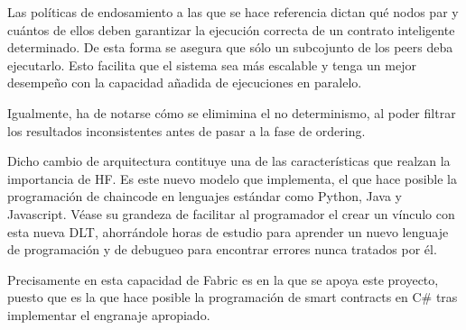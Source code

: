 Las pol\'iticas de endosamiento a las que se hace referencia dictan qu\'e nodos par y cu\'antos de ellos deben garantizar la ejecuci\'on correcta de un contrato inteligente determinado. De esta forma se asegura que s\'olo un subcojunto de los peers deba ejecutarlo. Esto facilita que el sistema sea m\'as escalable y tenga un mejor desempe\~no con la capacidad a\~nadida de ejecuciones en paralelo.

Igualmente, ha de notarse c\'omo se elimimina el no determinismo, al poder filtrar los resultados inconsistentes antes de pasar a la fase de ordering.

Dicho cambio de arquitectura contituye una de las caracter\'isticas que realzan la importancia de HF. Es este nuevo modelo que implementa, el que hace posible la programaci\'on de chaincode en lenguajes est\'andar como Python, Java y Javascript. V\'ease su grandeza de facilitar al programador el crear un v\'inculo con esta nueva DLT, ahorr\'andole horas de estudio para aprender un nuevo lenguaje de programaci\'on y de debugueo para encontrar errores nunca tratados por \'el.

Precisamente en esta capacidad de Fabric es en la que se apoya este proyecto, puesto que es la que hace posible la programaci\'on de smart contracts en C\# tras implementar el engranaje apropiado.
 




